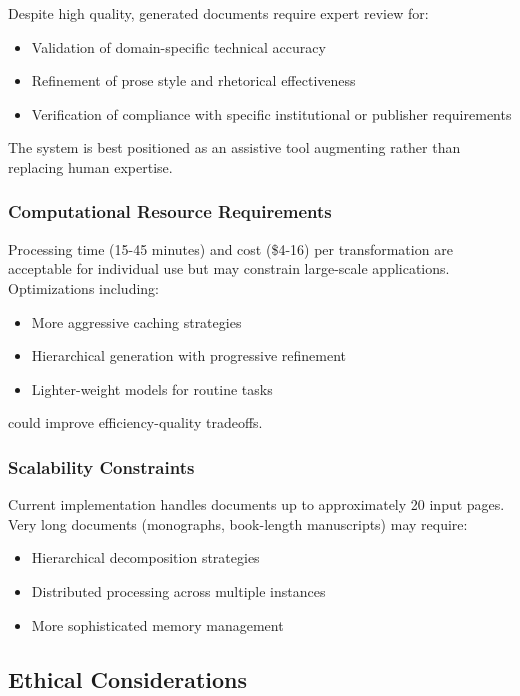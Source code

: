 \documentclass{ieeeaccess}
\begin{document}
Despite high quality, generated documents require expert review for:
\begin{itemize}
\item Validation of domain-specific technical accuracy
\item Refinement of prose style and rhetorical effectiveness
\item Verification of compliance with specific institutional or publisher requirements
\end{itemize}

The system is best positioned as an assistive tool augmenting rather than replacing human expertise.

\subsubsection{Computational Resource Requirements}

Processing time (15-45 minutes) and cost (\$4-16) per transformation are acceptable for individual use but may constrain large-scale applications. Optimizations including:
\begin{itemize}
\item More aggressive caching strategies
\item Hierarchical generation with progressive refinement
\item Lighter-weight models for routine tasks
\end{itemize}
could improve efficiency-quality tradeoffs.

\subsubsection{Scalability Constraints}

Current implementation handles documents up to approximately 20 input pages. Very long documents (monographs, book-length manuscripts) may require:
\begin{itemize}
\item Hierarchical decomposition strategies
\item Distributed processing across multiple instances
\item More sophisticated memory management
\end{itemize}

\subsection{Ethical Considerations}
\end{document}
